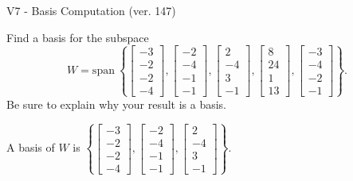 \begin{exercise}
  \begin{exerciseTitle}V7 - Basis Computation (ver. 147)\end{exerciseTitle}
  \begin{exerciseStatement}
    Find a basis for the subspace 
\[W=\mathrm{span}\ \left\{\left[\begin{array}{r}
-3 \\
-2 \\
-2 \\
-4
\end{array}\right] , \left[\begin{array}{r}
-2 \\
-4 \\
-1 \\
-1
\end{array}\right] , \left[\begin{array}{r}
2 \\
-4 \\
3 \\
-1
\end{array}\right] , \left[\begin{array}{r}
8 \\
24 \\
1 \\
13
\end{array}\right] , \left[\begin{array}{r}
-3 \\
-4 \\
-2 \\
-1
\end{array}\right]\right\}.\]
 Be sure to explain why your result is a basis.


  \end{exerciseStatement}
  \begin{exerciseAnswer}
   A basis of \(W\) is  \(\left\{\left[\begin{array}{r}
-3 \\
-2 \\
-2 \\
-4
\end{array}\right] , \left[\begin{array}{r}
-2 \\
-4 \\
-1 \\
-1
\end{array}\right] , \left[\begin{array}{r}
2 \\
-4 \\
3 \\
-1
\end{array}\right]\right\}\).
  


  \end{exerciseAnswer}
\end{exercise}
